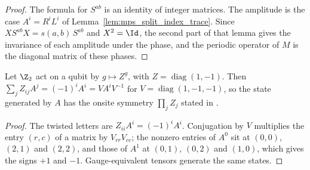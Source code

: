 \begin{proof}\leanok
    The formula for $S^{ab}$ is an identity of integer matrices. The
    amplitude is the case $A^i=R^iL^i$ of
    Lemma~\ref{lem:mps_split_index_trace}. Since $XS^{ab}X=s(a,b)\,S^{ab}$
    and $X^2=\Id$, the second part of that lemma gives the invariance of each
    amplitude under the phase, and the periodic operator of $M$ is the
    diagonal matrix of these phases.
\end{proof}

\begin{lemma}
    \label{lem:mpug_controlled_z_onsite_z}
    \leanok
    Let $\Z_2$ act on a qubit by $g\mapsto Z^g$, with
    $Z=\operatorname{diag}(1,-1)$. Then
    $\sum_jZ_{ij}A^j=(-1)^iA^i=VA^iV^{-1}$ for
    $V=\operatorname{diag}(1,-1,-1)$, so the state generated by $A$ has the
    onsite symmetry $\prod_jZ_j$ stated in
    \cite[line~3970]{FrancoRubio2025MPUGauging}.
\end{lemma}

\begin{proof}\leanok
    The twisted letters are $Z_{ii}A^i=(-1)^iA^i$. Conjugation by $V$
    multiplies the entry $(r,c)$ of a matrix by $V_{rr}V_{cc}$; the nonzero
    entries of $A^0$ sit at $(0,0)$, $(2,1)$ and $(2,2)$, and those of $A^1$
    at $(0,1)$, $(0,2)$ and $(1,0)$, which gives the signs $+1$ and $-1$.
    Gauge-equivalent tensors generate the same states.
\end{proof}

